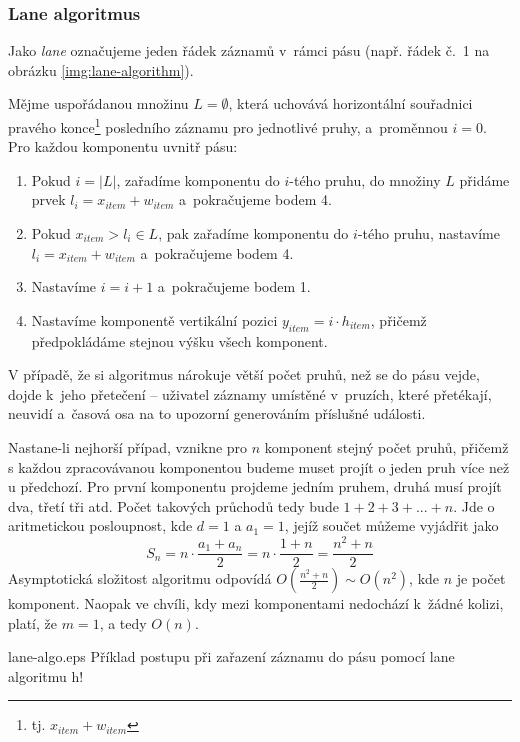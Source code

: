 			\subsubsection{Lane algoritmus}
				Jako \emph{lane} označujeme jeden řádek záznamů v~rámci pásu (např. řádek č.~1 na obrázku \ref{img:lane-algorithm}).
					
				Mějme uspořádanou množinu $L = \emptyset$, která uchovává horizontální souřadnici pravého konce\footnote{tj. $x_{item} + w_{item}$} posledního záznamu pro jednotlivé pruhy, a~proměnnou $i = 0$. Pro každou komponentu uvnitř pásu:
				\begin{enumerate}
					\item Pokud $i = |L|$, zařadíme komponentu do $i$-tého pruhu, do množiny $L$ přidáme prvek $l_i = x_{item} + w_{item}$ a~pokračujeme bodem 4.
					\item Pokud $x_{item} > l_i \in L$, pak zařadíme komponentu do $i$-tého pruhu, nastavíme $l_i = x_{item} + w_{item}$ a~pokračujeme bodem 4.
					\item Nastavíme $i = i+ 1$ a~pokračujeme bodem 1.
					\item Nastavíme komponentě vertikální pozici $y_{item} = i \cdot h_{item}$, přičemž před\-pokládáme stejnou výšku všech komponent.
				\end{enumerate}
				
				V případě, že si algoritmus nárokuje větší počet pruhů, než se do pásu vejde, dojde k~jeho přetečení -- uživatel záznamy umístěné v~pruzích, které přetékají, neuvidí a~časová osa na to upozorní generováním příslušné události.
				
				Nastane-li nejhorší případ, vznikne pro $n$ komponent stejný počet pruhů, přičemž s každou zpracovávanou komponentou budeme muset projít o jeden pruh více než u předchozí. Pro první komponentu projdeme jedním pruhem, druhá musí projít dva, třetí tři atd. Počet takových průchodů tedy bude $1 + 2 + 3 + ... + n$. Jde o aritmetickou posloupnost, kde $d = 1$ a $a_1 = 1$, jejíž součet můžeme vyjádřit jako \cite{aristotheles}
				$$ S_n = n \cdot \frac{a_1 + a_n}{2} = n \cdot \frac{1 + n}{2} = \frac{n^2 + n}{2} $$
				Asymptotická složitost algoritmu odpovídá $O(\frac{n^2 + n}{2}) \sim O(n^2)$, kde $n$ je počet komponent. Naopak ve chvíli, kdy mezi komponentami nedochází k~žádné kolizi, platí, že $m = 1$, a tedy $O(n)$.
				
					{}{lane-algo.eps}
					{Příklad postupu při zařazení záznamu do pásu pomocí lane algoritmu}
					{h!}
			
